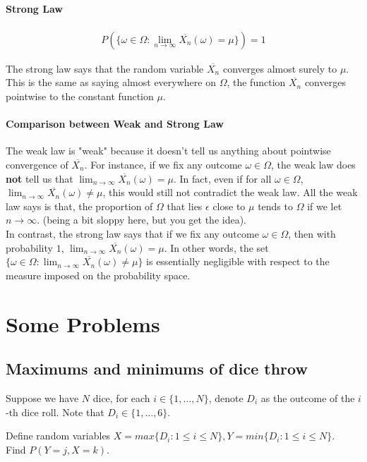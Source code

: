 \documentclass{article}
\begin{document}
\paragraph{Strong Law}
\begin{align*}
	P(\{\omega \in \Omega: \lim_{n\rightarrow \infty}\overline{X_n}(\omega) = \mu \}) = 1
\end{align*}

The strong law says that the random variable $\overline{X_n}$ converges almost surely to $\mu$. This is the same as saying almost everywhere on $\Omega$, the function $\overline{X_n}$ converges pointwise to the constant function $\mu$.

\paragraph{Comparison between Weak and Strong Law}
The weak law is "weak" because it doesn't tell us anything about pointwise convergence of $\overline{X_n}$. For instance, if we fix any outcome $\omega \in \Omega$, the weak law does \textbf{not} tell us that $\lim_{n\rightarrow \infty}\overline{X_n}(\omega)=\mu$. In fact, even if for all $\omega \in \Omega$, $\lim_{n\rightarrow \infty}\overline{X_n}(\omega)\neq \mu$, this would still not contradict the weak law. All the weak law says is that, the proportion of $\Omega$ that lies $\epsilon$ close to $\mu$ tends to $\Omega$ if we let $n\rightarrow \infty$. (being a bit sloppy here, but you get the idea).
\\
In contrast, the strong law says that if we fix any outcome $\omega \in \Omega$, then with probability $1$, $\lim_{n\rightarrow \infty}\overline{X_n}(\omega)=\mu$. In other words, the set $\{\omega \in \Omega: \lim_{n\rightarrow \infty}\overline{X_n}(\omega) \neq \mu \}$ is essentially negligible with respect to the measure imposed on the probability space.



\section{Some Problems}
\subsection{Maximums and minimums of dice throw}
Suppose we have $N$ dice, for each $i\in \{1,\dots,N\}$, denote $D_i$ as the outcome of the $i$-th dice roll. Note that $D_i\in \{1,\dots, 6\}$.

Define random variables $X=max\{D_i:1\leq i\leq N\}, Y=min\{D_i:1\leq i\leq N\}$.\\
Find $P(Y=j, X=k)$.
\end{document}
